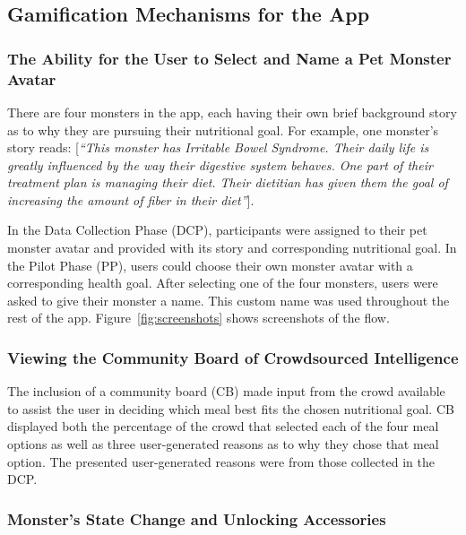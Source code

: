 \vspace{-5pt}
\subsection{Gamification Mechanisms for the App}
\subsubsection{The Ability for the User to Select and Name a Pet Monster Avatar} 
There are four monsters in the app, each having their own brief background story as to why they are pursuing their nutritional goal. 
For example, one monster's story reads: [\textit{``This monster has Irritable Bowel Syndrome. Their daily life is greatly influenced by the way their digestive system behaves. One part of their treatment plan is managing their diet. Their dietitian has given them the goal of increasing the amount of fiber in their diet''}]. 

In the Data Collection Phase (DCP), participants were assigned to their pet monster avatar and provided with its story and corresponding nutritional goal. In the Pilot Phase (PP), users could choose their own monster avatar with a corresponding health goal. After selecting one of the four monsters, users were asked to give their monster a name. 
This custom name was used throughout the rest of the app. Figure~\ref{fig:screenshots} shows screenshots of the flow.


\vspace{-5pt}
\subsubsection{Viewing the Community Board of Crowdsourced Intelligence}

The inclusion of a community board (CB) made input from the crowd available to assist the user in deciding which meal best fits the chosen nutritional goal. 
CB displayed both the percentage of the crowd that selected each of the four meal options as well as three user-generated reasons as to why they chose that meal option. The presented user-generated reasons were from those collected in the DCP. 




\vspace{-5pt}
\subsubsection{Monster's State Change and  Unlocking Accessories} 

